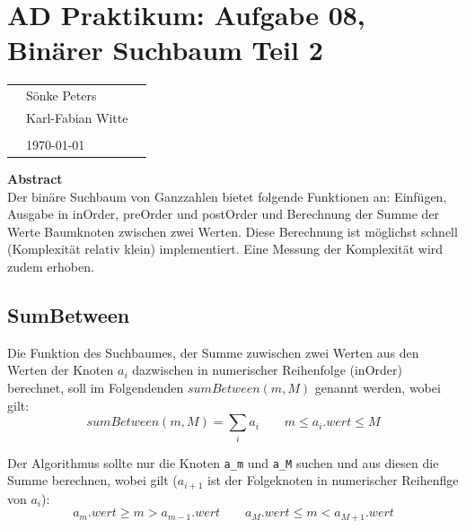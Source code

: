 \documentclass[
   draft=false
  ,paper=a4
  ,twoside=false
  ,fontsize=11pt
  ,headsepline
  ,DIV11
  ,parskip=full+
]{scrartcl} %
\begin{document}
\def\titel{AD Praktikum: Aufgabe 08, Binärer Suchbaum Teil 2}


\def\teilnehmer{ 
	& Sönke Peters & \\
    & Karl-Fabian Witte   & \\
}




\newlength{\txtw} %
\setlength{\txtw}{\textwidth} %
\addtolength{\txtw}{-10\tabcolsep} %

\def\me{\myName \newline \footnotesize{\url{\myEmail} } }

\section*{\titel}
\begin{tabular}{l p{0.4\txtw} p{0.4\txtw} }
	\teilnehmer
	& & \\
	& \today & \\
\end{tabular}


\centering
\textbf{Abstract} \\
Der binäre Suchbaum von Ganzzahlen bietet folgende Funktionen an: Einfügen, Ausgabe in inOrder, preOrder und postOrder und Berechnung der Summe der Werte Baumknoten zwischen zwei Werten. Diese Berechnung ist möglichst schnell (Komplexität relativ klein) implementiert. Eine Messung der Komplexität wird zudem erhoben. 
\normalsize \flushleft
\subsection*{SumBetween}
Die Funktion des Suchbaumes, der Summe zuwischen zwei Werten aus den Werten der Knoten $a_i$ dazwischen in numerischer Reihenfolge (inOrder) berechnet, soll im Folgendenden $sumBetween(m, M)$ genannt werden, wobei gilt:
\[
sumBetween(m,M) = \sum_i a_i  \qquad m \leq a_i.wert \leq M
\]

Der Algorithmus sollte nur die Knoten \texttt{a\_m} und \texttt{a\_M} suchen und aus diesen die Summe berechnen, wobei gilt ($a_{i+1}$ ist der 
Folgeknoten in numerischer Reihenflge von $a_i$):
\[
 a_m.wert \geq m > a_{m-1}.wert  \qquad a_M.wert \leq m < a_{M+1}.wert 
\]
\end{document}

